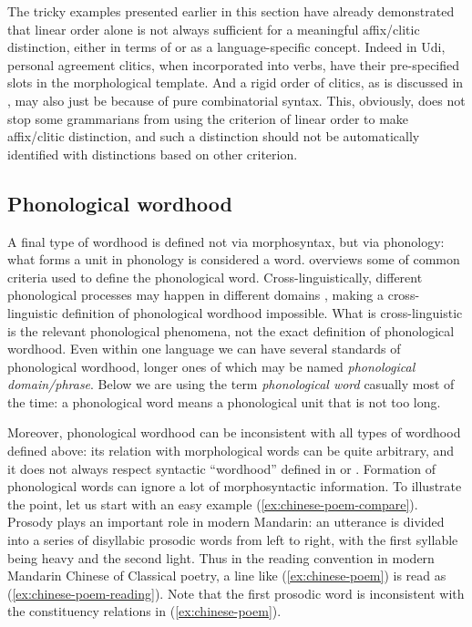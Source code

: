 \documentclass[a4paper, oneside, scheme=plain, 12pt]{article}
\newcommand*{\citesec}[1]{\S~{#1}}
\newcommand*{\citepage}[1]{p.~{#1}}
\newcommand*{\term}[1]{\emph{#1}}
\begin{document}
The tricky examples presented earlier in this section have already demonstrated that linear order alone is not always sufficient for a meaningful affix/clitic distinction,
either in terms of \citet{embick2007linearization} or as a language-specific concept.
Indeed in Udi, personal agreement clitics,
when incorporated into verbs, have their pre-specified slots in the morphological template. 
And a rigid order of clitics, as is discussed in , may also just be because of pure combinatorial syntax. 
This, obviously, does not stop some grammarians from using the criterion of linear order to make affix/clitic distinction, and such a distinction should not be automatically identified with distinctions based on other criterion.

\subsection{Phonological wordhood}\label{sec:phonological}

A final type of wordhood is defined not via morphosyntax, but via phonology:
what forms a unit in phonology is considered a word.
\citet[\citesec{10.3}]{dixon2010basic2} overviews some of common criteria used to define the phonological word.
Cross-linguistically, different phonological processes may happen in different domains \citep[\citepage{62}]{schackow2015grammar},
making a cross-linguistic definition of phonological wordhood impossible.
What is cross-linguistic is the relevant phonological phenomena,
not the exact definition of phonological wordhood.
Even within one language we can have several standards of phonological wordhood,
longer ones of which may be named \term{phonological domain/phrase}.
Below we are using the term \term{phonological word} casually most of the time:
a phonological word means a phonological unit that is not too long.

Moreover, phonological wordhood can be inconsistent with all types of wordhood defined above:
its relation with morphological words can be quite arbitrary,
and it does not always respect syntactic ``wordhood'' defined in  or .
Formation of phonological words can ignore a lot of morphosyntactic information.
To illustrate the point, let us start with an easy example (\ref{ex:chinese-poem-compare}).
Prosody plays an important role in modern Mandarin:
an utterance is divided into a series of disyllabic prosodic words from left to right,
with the first syllable being heavy and the second light.
Thus in the reading convention in modern Mandarin Chinese of Classical poetry,
a line like (\ref{ex:chinese-poem}) is read as (\ref{ex:chinese-poem-reading}).
Note that the first prosodic word is inconsistent with the constituency relations in (\ref{ex:chinese-poem}).
\end{document}
